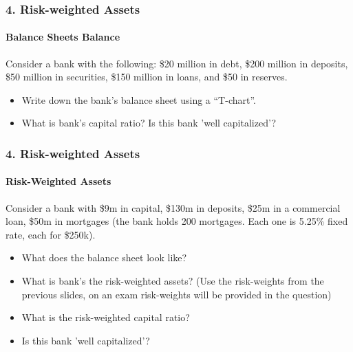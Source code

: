 \documentclass{beamer}
\begin{document}
\begin{practiceframe}[t]
    \frametitle{4. Risk-weighted Assets}
    \framesubtitle{Balance Sheets Balance}

    Consider a bank with the following: \$20 million in debt, \$200 million in deposits, \$50 million in securities, \$150 million in loans, and \$50 in reserves.    
    \vspace{1em}

    \begin{itemize}
        \item Write down the bank’s balance sheet using a “T-chart”.
        \item What is bank's capital ratio?   Is this bank 'well capitalized'?
    \end{itemize}

\end{practiceframe}

\begin{practiceframe}[t]
    \frametitle{4. Risk-weighted Assets}
    \framesubtitle{Risk-Weighted Assets}

    Consider a bank with \$9m in capital, \$130m in deposits, \$25m in a commercial loan, \$50m in mortgages (the bank holds 200 mortgages.  Each one is 5.25\% fixed rate, each for \$250k).
    \vspace{1em}
    
    \begin{itemize}
        \item What does the balance sheet look like?
        \item What is bank’s the risk-weighted assets?  (Use the risk-weights from the previous slides, on an exam risk-weights will be provided in the question)
        \item What is the risk-weighted capital ratio?
        \item Is this bank 'well capitalized'?
    \end{itemize}

\end{practiceframe}
\end{document}
